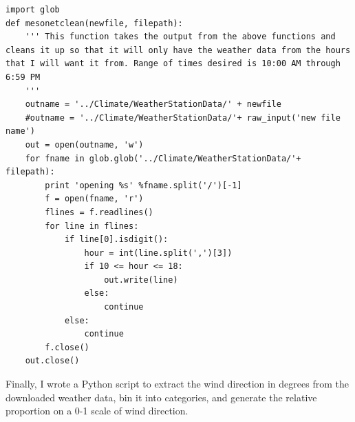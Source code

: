 \begin{lstlisting}
import glob
def mesonetclean(newfile, filepath):
    ''' This function takes the output from the above functions and cleans it up so that it will only have the weather data from the hours that I will want it from. Range of times desired is 10:00 AM through 6:59 PM
    '''
    outname = '../Climate/WeatherStationData/' + newfile
    #outname = '../Climate/WeatherStationData/'+ raw_input('new file name')
    out = open(outname, 'w')
    for fname in glob.glob('../Climate/WeatherStationData/'+ filepath):
        print 'opening %s' %fname.split('/')[-1]
        f = open(fname, 'r')
        flines = f.readlines()
        for line in flines:
            if line[0].isdigit():
                hour = int(line.split(',')[3])
                if 10 <= hour <= 18:
                    out.write(line)
                else:
                    continue
            else:
                continue
        f.close()
    out.close() 
\end{lstlisting}

Finally, I wrote a Python script to extract the wind direction in degrees from the downloaded weather data, bin it into categories, and generate the relative proportion on a 0-1 scale of wind direction.

